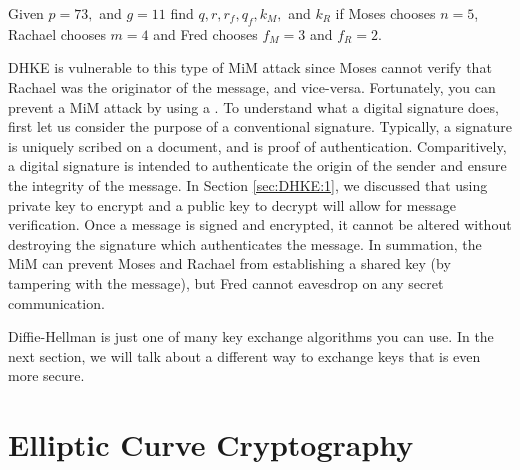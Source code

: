 \begin{exercise}{}
Given $p=73,$ and $g=11$ find $q, r, r_f, q_f, k_M,$ and $k_R$ if Moses chooses $n=5$, Rachael chooses $m=4$ and Fred chooses $f_M=3$ and $f_R=2$.
\end{exercise}

DHKE is vulnerable to this type of MiM attack since Moses cannot verify that Rachael was the originator of the message, and vice-versa.  Fortunately, you can prevent a MiM attack by using a .  To understand what a digital signature does, first let us consider the purpose of a conventional signature.  Typically, a signature is uniquely scribed on a document, and is proof of authentication.  Comparitively, a digital signature is intended to authenticate the origin of the sender and ensure the integrity of the message.  In Section \ref{sec:DHKE:1}, we discussed that using private key to encrypt and a public key to decrypt will allow for message verification.  Once a message is signed and encrypted, it cannot be altered without destroying the signature which authenticates the message. In summation, the MiM can prevent Moses and Rachael from establishing a shared key (by tampering with the message), but Fred cannot eavesdrop on any secret communication.

 Diffie-Hellman is just one of many key exchange algorithms you can use. In the next section, we will talk about a different way to exchange keys that is even more secure.

\section{Elliptic Curve Cryptography}\label{sec:ECC:2}

